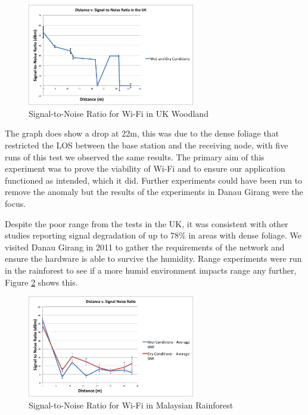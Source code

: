 			\begin{figure}[!t]
			\centering
			\includegraphics[width=0.65\textwidth]{Chap3/figures/bp_snr.png}
			\caption{Signal-to-Noise Ratio for Wi-Fi in UK Woodland}
			\label{cardiffsnr}
			\end{figure}
			
	The graph does show a drop at 22m, this was due to the dense foliage that restricted the LOS between the base station and the receiving node, with five runs of this test we observed the same results. The primary aim of this experiment was to prove the viability of Wi-Fi and to ensure our application functioned as intended, which it did. Further experiments could have been run to remove the anomaly but the results of the experiments in Danau Girang were the focus.
		 
	Despite the poor range from the tests in the UK, it was consistent with other studies reporting signal degradation of up to 78\% in areas with dense foliage. We visited Danau Girang in 2011 to gather the requirements of the network and ensure the hardware is able to survive the humidity. Range experiments were run in the rainforest to see if a more humid environment impacts range any further, Figure \ref{malaysiasnr} shows this.
			
			\begin{figure}[!t]
			\centering
			\includegraphics[width=0.65\textwidth]{Chap3/figures/dg_snr.png}
			\caption{Signal-to-Noise Ratio for Wi-Fi in Malaysian Rainforest}
			\label{malaysiasnr}
			\end{figure}
						
